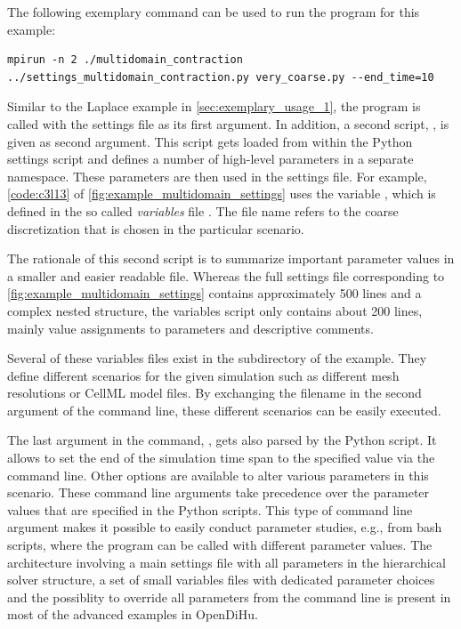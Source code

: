 The following exemplary command can be used to run the program for this example:
\begin{lstlisting}[columns=fullflexible,breaklines=true,postbreak=\mbox{\textcolor{gray}{$\hookrightarrow$}\space}]
  mpirun -n 2 ./multidomain_contraction ../settings_multidomain_contraction.py very_coarse.py --end_time=10
\end{lstlisting}
Similar to the Laplace example in \cref{sec:exemplary_usage_1}, the program  is called with the settings file  as its first argument. In addition, a second script, , is given as second argument. This script gets loaded from within the Python settings script and defines a number of high-level parameters in a separate  namespace. These parameters are then used in the settings file. For example, \cref{code:c3l13} of \cref{fig:example_multidomain_settings} uses the variable , which is defined in the so called \emph{variables} file . The file name refers to the coarse discretization that is chosen in the particular scenario.

The rationale of this second script is to summarize important parameter values in a smaller and easier readable file. Whereas the full settings file corresponding to \cref{fig:example_multidomain_settings} contains approximately 500 lines and a complex nested structure, the variables script only contains about 200 lines, mainly value assignments to parameters and descriptive comments. 

Several of these variables files exist in the  subdirectory of the example. They define different scenarios for the given simulation such as different mesh resolutions or CellML model files. By exchanging the filename in the second argument of the command line, these different scenarios can be easily executed.

The last argument in the command, , gets also parsed by the Python script. It allows to set the end of the simulation time span to the specified value via the command line. Other options are available to alter various parameters in this scenario. These command line arguments take precedence over the parameter values that are specified in the Python scripts. This type of command line argument makes it possible to easily conduct parameter studies, e.g., from bash scripts, where the program can be called with different parameter values.
The architecture involving a main settings file with all parameters in the hierarchical solver structure, a set of small variables files with dedicated parameter choices and the possiblity to override all parameters from the command line is present in most of the advanced examples in OpenDiHu.


